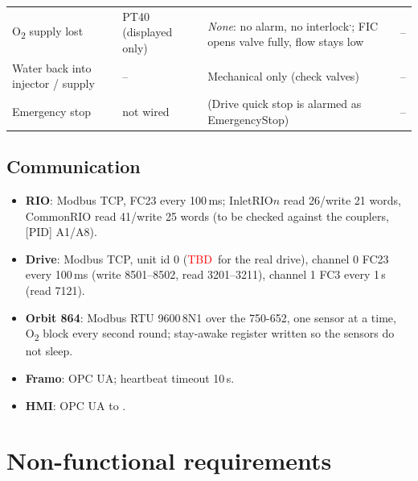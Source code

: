 \documentclass[11pt,a4paper]{article}
\newcommand{\Otwo}{O\textsubscript{2}}
\newcommand{\TBD}{\textcolor{red}{TBD}}
\begin{document}
\begin{small}
\begin{longtable}{@{}P{34mm}P{40mm}P{48mm}P{30mm}@{}}
\Otwo{} supply lost & PT40 (displayed only) & \emph{None}: no alarm, no interlock\textsuperscript{,}; FIC opens valve fully, flow stays low & -- \\
Water back into injector / supply & -- & Mechanical only (check valves) & -- \\
Emergency stop & not wired & (Drive quick stop is alarmed as EmergencyStop) & -- \\
\end{longtable}
\end{small}

\subsection{Communication}
\begin{itemize}[nosep]
  \item \textbf{RIO}: Modbus TCP, FC23 every 100\,ms; InletRIO$n$ read 26/write 21 words, CommonRIO read
        41/write 25 words (to be checked against the couplers, [PID] A1/A8).
  \item \textbf{Drive}: Modbus TCP, unit id 0 (\TBD\ for the real drive), channel 0 FC23 every 100\,ms
        (write 8501--8502, read 3201--3211), channel 1 FC3 every 1\,s (read 7121).
  \item \textbf{Orbit 864}: Modbus RTU 9600\,8N1 over the 750-652, one sensor at a time, \Otwo{} block
        every second round; stay-awake register written so the sensors do not sleep.
  \item \textbf{Framo}: OPC UA; heartbeat timeout 10\,s.
  \item \textbf{HMI}: OPC UA to .
\end{itemize}

\section{Non-functional requirements}
\label{sec:nfreq}
\end{document}
